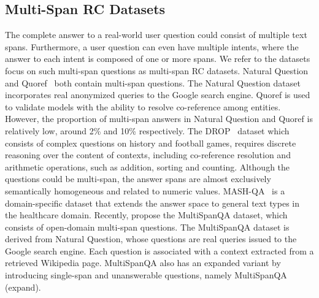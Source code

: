 \documentclass[a4paper,fleqn,twocolumn]{cas-dc}
\newcommand{\1}[1]{\mathds{1}\left[#1\right]}
\begin{document}
\subsection{Multi-Span RC Datasets}
The complete answer to a real-world user question could consist of multiple text spans. 
Furthermore, a user question can even have multiple intents, where the answer to each intent is composed of one or more spans. 
We refer to the datasets focus on such multi-span questions as multi-span RC datasets.
Natural Question~\citep{DBLP:journals/tacl/KwiatkowskiPRCP19} and Quoref~\citep{DBLP:conf/emnlp/DasigiLMSG19} both contain multi-span questions. 
The Natural Question dataset incorporates real anonymized queries to the Google search engine. 
Quoref is used to validate models with the ability to resolve co-reference among entities. %
However, the proportion of multi-span answers in Natural Question and Quoref is relatively low, around 2\% and 10\% respectively. 
The DROP~\citep{DBLP:conf/naacl/DuaWDSS019} dataset which consists of complex questions on history and football games, requires discrete reasoning over the content of contexts, including  co-reference resolution and arithmetic operations, such as addition, sorting and counting. 
Although the questions could be multi-span, the answer spans are almost exclusively semantically homogeneous and related to numeric values. 
MASH-QA~\citep{DBLP:conf/aaai/PangLGXSC19} is a domain-specific dataset that extends the answer space to general text types in the healthcare domain.
Recently, \cite{li2022multispanqa} propose the MultiSpanQA dataset, which consists of open-domain multi-span questions. The MultiSpanQA dataset is derived from Natural Question, whose questions are real queries issued to the Google search engine. 
Each question is associated with a context extracted from a retrieved Wikipedia page.  
MultiSpanQA also has an expanded variant by introducing single-span and unanswerable questions, namely MultiSpanQA (expand). 
\end{document}
